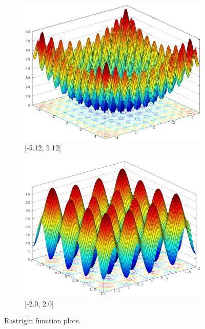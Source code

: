 \documentclass[12pt, a4paper]{article}
\begin{document}
		\begin{figure}[ht]
			\begin{subfigure}{0.49\textwidth}
				\includegraphics[width=\linewidth]{Images/Rastrigin_large}
				\caption{[-5.12, 5.12]}
			\end{subfigure}
			\begin{subfigure}{0.49\textwidth}
				\includegraphics[width=\linewidth]{Images/Rastrigin_small}
				\caption{[-2.0, 2.0]}
			\end{subfigure}
			\caption{Rastrigin function plots.}
		\end{figure}

	\newpage
\end{document}
